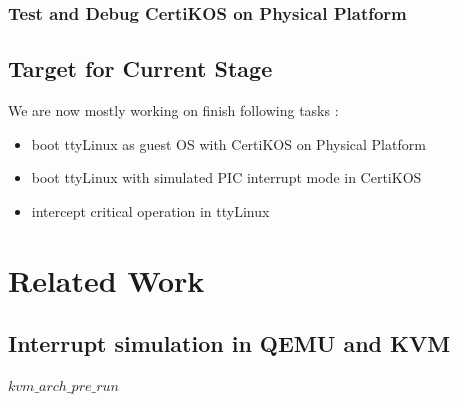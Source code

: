 \documentclass[a4paper,12pt]{article}
\begin{document}
\subsubsection{Test and Debug CertiKOS on Physical Platform}


\subsection{Target for Current Stage}
We are now mostly working on finish following tasks : 
\begin{itemize}
\item boot ttyLinux as guest OS with CertiKOS on Physical Platform
\item boot ttyLinux with simulated PIC interrupt mode  in CertiKOS
\item intercept  critical operation in ttyLinux
\end{itemize}


\section{Related Work}

\subsection{Interrupt simulation in QEMU and KVM}
$kvm\_arch\_pre\_run$





\end{document}
